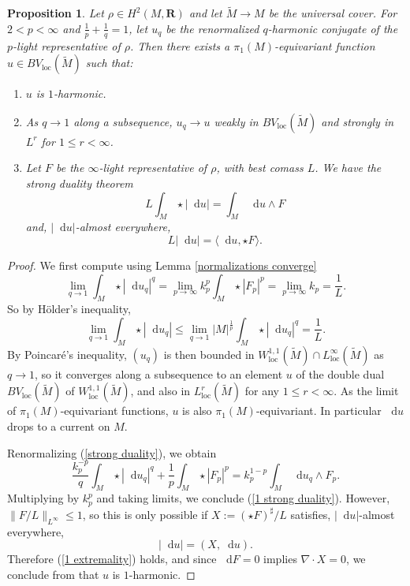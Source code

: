 \documentclass[reqno,11pt]{amsart}
\newcommand{\RR}{\mathbf{R}}
\newcommand*\dif{\mathop{}\!\mathrm{d}}
\newcommand{\loc}{\mathrm{loc}}
\newtheorem{proposition}[theorem]{Proposition}
\theoremstyle{definition}
\numberwithin{equation}{section}
\begin{document}
\begin{proposition}\label{existence 1}
Let $\rho \in H^2(M, \RR)$ and let $\tilde M \to M$ be the universal cover.
For $2 < p < \infty$ and $\frac{1}{p} + \frac{1}{q} = 1$, let $u_q$ be the renormalized $q$-harmonic conjugate of the $p$-light representative of $\rho$.
Then there exists a $\pi_1(M)$-equivariant function $u \in BV_\loc(\tilde M)$ such that:
\begin{enumerate}
\item $u$ is $1$-harmonic.
\item As $q \to 1$ along a subsequence, $u_q \to u$ weakly in $BV_\loc(\tilde M)$ and strongly in $L^r$ for $1 \leq r < \infty$.
\item Let $F$ be the $\infty$-light representative of $\rho$, with best comass $L$. We have the strong duality theorem 
\begin{equation}\label{1 strong duality}
	L \int_M \star |\dif u| = \int_M \dif u \wedge F
\end{equation}
and, $|\dif u|$-almost everywhere,
\begin{equation}\label{1 extremality}
L |\dif u| = \langle \dif u, \star F\rangle.
\end{equation}
\end{enumerate}
\end{proposition}
\begin{proof}
We first compute using Lemma \ref{normalizations converge}
\begin{equation}\label{Lqs of qLaplace converge}
\lim_{q \to 1} \int_M \star |\dif u_q|^q = \lim_{p \to \infty} k_p^p \int_M \star |F_p|^p = \lim_{p \to \infty} k_p = \frac{1}{L}.
\end{equation}
So by H\"older's inequality,
$$\lim_{q \to 1} \int_M \star |\dif u_q| \leq \lim_{q \to 1} |M|^{\frac{1}{p}} \int_M \star |\dif u_q|^q = \frac{1}{L}.$$
By Poincar\'e's inequality, $(u_q)$ is then bounded in $W^{1, 1}_\loc(\tilde M) \cap L^\infty_\loc(\tilde M)$ as $q \to 1$, so it converges along a subsequence to an element $u$ of the double dual $BV_\loc(\tilde M)$ of $W^{1, 1}_\loc(\tilde M)$, and also in $L^r_\loc(\tilde M)$ for any $1 \leq r < \infty$.
As the limit of $\pi_1(M)$-equivariant functions, $u$ is also $\pi_1(M)$-equivariant.
In particular $\dif u$ drops to a current on $M$.

Renormalizing (\ref{strong duality}), we obtain 
$$\frac{k_p^{-p}}{q} \int_M \star |\dif u_q|^q + \frac{1}{p} \int_M \star |F_p|^p = k_p^{1 - p} \int_M \dif u_q \wedge F_p.$$
Multiplying by $k_p^p$ and taking limits, we conclude (\ref{1 strong duality}).
However, $\|F/L\|_{L^\infty} \leq 1$, so this is only possible if $X := (\star F)^\sharp/L$ satisfies, $|\dif u|$-almost everywhere,
$$|\dif u| = (X, \dif u).$$
Therefore (\ref{1 extremality}) holds, and since $\dif F = 0$ implies $\nabla \cdot X = 0$, we conclude from \cite{Mazon14} that $u$ is $1$-harmonic.
\end{proof}
\end{document}
